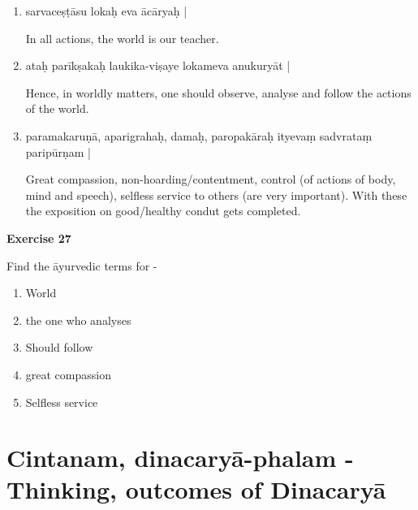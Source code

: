 \begin{enumerate}
\item {}

sarvaceṣṭāsu lokaḥ eva ācāryaḥ |

In all actions, the world is our teacher.

\item {}

ataḥ parīkṣakaḥ laukika-viṣaye lokameva anukuryāt |

Hence, in worldly matters,  one should observe, analyse and follow the actions of the world. 

\item {}

paramakaruṇā, aparigrahaḥ, damaḥ, paropakāraḥ ityevaṃ sadvrataṃ paripūrṇam | 

Great compassion, non-hoarding/contentment, control (of actions of body, mind and speech), selfless service to others (are very important). With these the exposition on good/healthy condut gets completed.
\end{enumerate}

\begin{center}
\textbf{\large Exercise 27}
\end{center}

Find the āyurvedic terms for -

\begin{enumerate}
\renewcommand{\theenumi}{\alph{enumi}}
\renewcommand{\labelenumi}{\theenumi.}
\item World
\item the one who analyses
\item Should follow
\item great compassion
\item Selfless service
\end{enumerate}

\chapter{Cintanam, dinacaryā-phalam - Thinking, outcomes of Dinacaryā}

